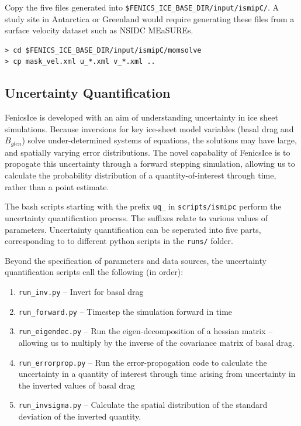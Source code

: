 \documentclass[11pt, reqno, nocenter]{article}
\begin{document}
Copy the five files generated into {\tt \$FENICS\_ICE\_BASE\_DIR/input/ismipC/}. A study site in Antarctica or Greenland would require generating these files  from a surface velocity dataset such as NSIDC MEaSUREs.

\begin{verbatim}
> cd $FENICS_ICE_BASE_DIR/input/ismipC/momsolve
> cp mask_vel.xml u_*.xml v_*.xml ..
\end{verbatim}

\subsection{Uncertainty Quantification} \label{sec:uq}

FenicsIce is developed with an aim of understanding uncertainty in ice sheet simulations. Because inversions for key ice-sheet model variables (basal drag and $B_{glen}$) solve under-determined systems of equations, the solutions may have large, and spatially varying error distributions. The novel capabality of FenicsIce is to propogate this uncertainty through a forward stepping simulation, allowing us to calculate the probability distribution of a quantity-of-interest through time, rather than a point estimate. 

The bash scripts starting with the prefix {\tt uq\_} in {\tt scripts/ismipc} perform the uncertainty quantification process. The suffixes relate to various values of parameters. Uncertainty quantification can be seperated into five parts, corresponding to to different python scripts in the {\tt runs/} folder.

Beyond the specification of parameters and data sources, the uncertainty quantification scripts call the following (in order):

\begin{enumerate}
	\item {\tt run\_inv.py} -- Invert for basal drag
	\item {\tt run\_forward.py} -- Timestep the simulation forward in time
	\item {\tt run\_eigendec.py} -- Run the eigen-decomposition of a hessian matrix -- allowing us to multiply by the inverse of the covariance matrix of basal drag.
	\item {\tt run\_errorprop.py} -- Run the error-propogation code to calculate the uncertainty in a quantity of interest through time arising from uncertainty in the inverted values of basal drag
	\item {\tt run\_invsigma.py} -- Calculate the spatial distribution of the standard deviation of the inverted quantity.
\end{enumerate}
\end{document}
